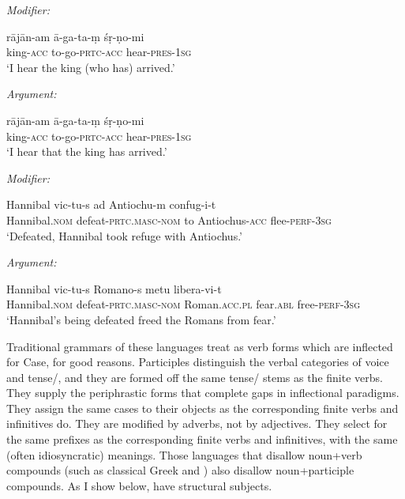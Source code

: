 \documentclass[output=paper,
modfonts
]{LSP/langsci}
\begin{document}
\begin{exe}
	\ex \label{ex:kip:2d}  
		\ea \textit{Modifier:}
 
 		\gll rājān-am ā-ga-ta-ṃ śṛ-ṇo-mi \\
		king-\textsc{acc} to-go-\textsc{prtc}-\textsc{acc} hear-\textsc{pres}-\textsc{1sg}\\
		\glt `I hear the king (who has) arrived.' 

		\ex \textit{Argument:}

		\gll rājān-am  ā-ga-ta-ṃ śṛ-ṇo-mi \\
		king-\textsc{acc} to-go-\textsc{prtc}-\textsc{acc} hear-\textsc{pres}-\textsc{1sg}\\
		\glt `I hear that the king has arrived.'
		\z  

	\ex \label{ex:kip:2e}  
		\ea \textit{Modifier:}
 
 		\gll Hannibal vic-tu-s ad Antiochu-m confug-i-t\\
		Hannibal.\textsc{nom} defeat-\textsc{prtc}.\textsc{masc}-\textsc{nom} to Antiochus-\textsc{acc} flee-\textsc{perf}-\textsc{3sg}\\
		\glt `Defeated, Hannibal took refuge with Antiochus.' 

		\ex \textit{Argument:}

		\gll Hannibal vic-tu-s Romano-s metu libera-vi-t\\
		Hannibal.\textsc{nom} defeat-\textsc{prtc}.\textsc{masc}-\textsc{nom} Roman.\textsc{acc}.\textsc{pl}
		fear.\textsc{abl} free-\textsc{perf}-\textsc{3sg}\\
		\glt `Hannibal's being defeated freed the Romans from fear.'
		\z  
	\z    
\end{exe}
Traditional grammars of these languages treat  as verb forms which are inflected for Case,
for good reasons.  Participles distinguish the verbal categories of voice and tense/, and
they are formed off the same tense/ stems as the finite verbs.  They supply the
periphrastic forms that complete gaps in inflectional paradigms.  They assign the same cases to
their objects as the corresponding finite verbs and infinitives do.  They are modified by
adverbs, not by adjectives. They select for the same prefixes as the corresponding finite verbs
and infinitives, with the same (often idiosyncratic) meanings.  Those languages that disallow
noun+verb compounds (such as classical Greek and ) also disallow noun+participle
compounds.  As I show below,  have structural subjects.
\end{document}

